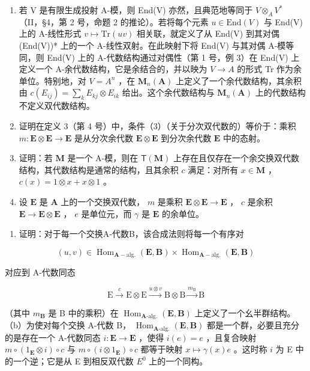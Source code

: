 \BourbakiExercisesSection

\begin{enumerate}
\def\labelenumi{\arabic{enumi}.}
\item
  若 V 是有限生成投射 A-模，则 End(V) 亦然，且典范地等同于 \(V \otimes_{A} V^{*}\) （II，§4，第 2 号，命题 2 的推论）。若将每个元素 \(u \in \text{End}(V)\) 与 End(V) 上的 A-线性形式 \(v \mapsto \text{Tr}(uv)\) 相关联，就定义了从 End(V) 到其对偶 (End(V))* 上的一个 A-线性双射。在此映射下将 End(V) 与其对偶 A-模等同，则 End(V) 上的 A-代数结构通过对偶性（第 1 号，例 3）在 End(V) 上定义一个 A-余代数结构，它是余结合的，并以映为 \(V \to A\) 的形式 Tr 作为余单位。特别地，对 \(V = A^{n}\) ，在 \(\mathbf{M}_{n}(\mathbf{A})\) 上定义了一个余代数结构，其余积由 \(c(E_{ij}) = \sum_{k} E_{kj} \otimes E_{ik}\) 给出。这个余代数结构与 \(\mathbf{M}_{n}(\mathbf{A})\) 上的代数结构不定义双代数结构。
\item
  证明在定义 3（第 4 号）中，条件（3）（关于分次双代数的）等价于：乘积 \(m: \mathbf{E} \otimes \mathbf{E} \to \mathbf{E}\) 是从分次余代数 \(\mathbf{E} \otimes \mathbf{E}\) 到分次余代数 \(\mathbf{E}\) 中的态射。
\item
  证明：若 \(\mathbf{M}\) 是一个 A-模，则在 \(\mathsf{T}(\mathbf{M})\) 上存在且仅存在一个余交换双代数结构，其代数结构是通常的结构，且其余积 \(c\) 满足：对所有 \(x\in \mathbf{M}\) ， \(c(x) = 1\otimes x + x\otimes 1\) 。
\item
  设 \(\mathbf{E}\) 是 \(\mathbf{A}\) 上的一个交换双代数， \(m\) 是乘积 \(\mathbf{E} \otimes \mathbf{E} \to \mathbf{E}\) ， \(c\) 是余积 \(\mathbf{E} \to \mathbf{E} \otimes \mathbf{E}\) ， \(e\) 是单位元，而 \(\gamma\) 是 \(\mathbf{E}\) 的余单位。
\end{enumerate}

\begin{enumerate}
\def\labelenumi{(\alph{enumi})}
\tightlist
\item
  证明：对于每一个交换A-代数B，该合成法则将每一个有序对
\end{enumerate}

\[
(u, v) \in \operatorname{Hom} _ {\mathbf {A} - \mathrm{alg.}} (\mathbf {E}, \mathbf {B}) \times \operatorname{Hom} _ {\mathbf {A} - \mathrm{alg.}} (\mathbf {E}, \mathbf {B})
\]

对应到 A-代数同态

\[
\mathrm{E} \xrightarrow {c} \mathrm{E} \otimes \mathrm{E} \xrightarrow {u \otimes v} \mathrm{B} \otimes \mathrm{B} \xrightarrow {m _ {\mathrm{B}}} \mathrm{B}
\]

（其中 \(m_{\mathbf{B}}\) 是 B 中的乘积）在 \(\operatorname{Hom}_{\mathbf{A}\text{-alg.}}(\mathbf{E}, \mathbf{B})\) 上定义了一个幺半群结构。（b）为使对每个交换 A-代数 B， \(\operatorname{Hom}_{\mathbf{A}\text{-alg.}}(\mathbf{E}, \mathbf{B})\) 都是一个群，必要且充分的是存在一个 A-代数同态 \(i: \mathbf{E} \to \mathbf{E}\) ，使得 \(i(e) = e\) ，且复合映射 \(m \circ (1_{\mathbf{E}} \otimes i) \circ c\) 与 \(m \circ (i \otimes 1_{\mathbf{E}}) \circ c\) 都等于映射 \(x \mapsto \gamma(x)e\) 。这时称 \(i\) 为 E 中的一个逆；它是从 E 到相反双代数 \(E^0\) 上的一个同构。

